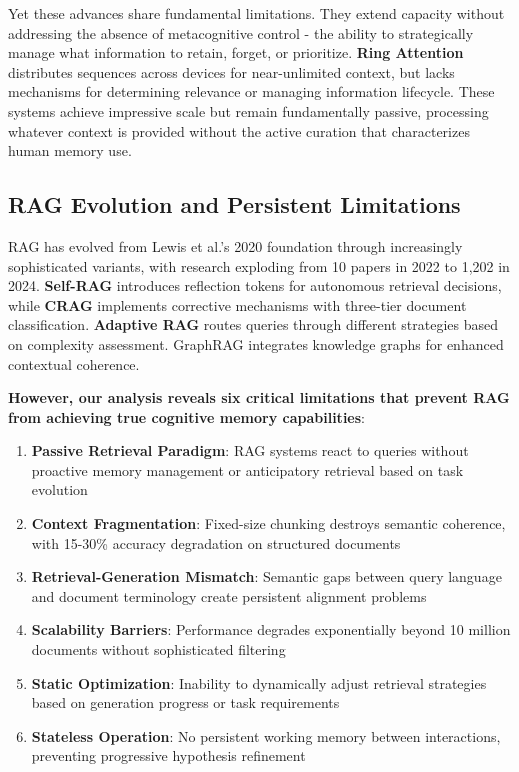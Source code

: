 \documentclass[10pt,twocolumn]{article}
\begin{document}
Yet these advances share fundamental limitations. They extend capacity without addressing the absence of metacognitive control - the ability to strategically manage what information to retain, forget, or prioritize. \textbf{Ring Attention} \cite{liu2024ring} distributes sequences across devices for near-unlimited context, but lacks mechanisms for determining relevance or managing information lifecycle. These systems achieve impressive scale but remain fundamentally passive, processing whatever context is provided without the active curation that characterizes human memory use.

\subsection{RAG Evolution and Persistent Limitations}

RAG has evolved from Lewis et al.'s 2020 foundation \cite{lewis2020retrieval} through increasingly sophisticated variants, with research exploding from 10 papers in 2022 to 1,202 in 2024. \textbf{Self-RAG} \cite{asai2023self} introduces reflection tokens for autonomous retrieval decisions, while \textbf{CRAG} \cite{yan2024corrective} implements corrective mechanisms with three-tier document classification. \textbf{Adaptive RAG} \cite{jeong2024adaptive} routes queries through different strategies based on complexity assessment. GraphRAG \cite{edge2024local} integrates knowledge graphs for enhanced contextual coherence.

\textbf{However, our analysis reveals six critical limitations that prevent RAG from achieving true cognitive memory capabilities}:

\begin{enumerate}
\item \textbf{Passive Retrieval Paradigm}: RAG systems react to queries without proactive memory management or anticipatory retrieval based on task evolution
\item \textbf{Context Fragmentation}: Fixed-size chunking destroys semantic coherence, with 15-30\% accuracy degradation on structured documents
\item \textbf{Retrieval-Generation Mismatch}: Semantic gaps between query language and document terminology create persistent alignment problems
\item \textbf{Scalability Barriers}: Performance degrades exponentially beyond 10 million documents without sophisticated filtering
\item \textbf{Static Optimization}: Inability to dynamically adjust retrieval strategies based on generation progress or task requirements
\item \textbf{Stateless Operation}: No persistent working memory between interactions, preventing progressive hypothesis refinement
\end{enumerate}
\end{document}
